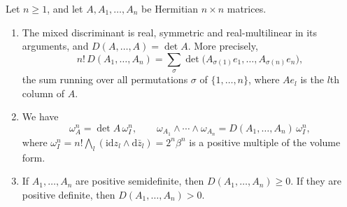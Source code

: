 \begin{lemma}\label{lem:mixed-discriminant-basic}
Let $n\geq1$, and let $A,A_1,\ldots,A_n$ be Hermitian $n\times n$ matrices.
\begin{enumerate}
\item The mixed discriminant is real, symmetric and real-multilinear in its arguments, and $D(A,\ldots,A)=\det A$. More precisely,
\[
 n!\,D(A_1,\ldots,A_n)=\sum_\sigma\det\big(A_{\sigma(1)}e_1,\ldots,A_{\sigma(n)}e_n\big),
\]
the sum running over all permutations $\sigma$ of $\{1,\ldots,n\}$, where $Ae_l$ is the $l$th column of $A$.
\item We have
\[
 \omega_A^n=\det A\,\omega_I^n,\qquad
 \omega_{A_1}\wedge\cdots\wedge\omega_{A_n}=D(A_1,\ldots,A_n)\,\omega_I^n,
\]
where $\omega_I^n=n!\bigwedge_l(\mathrm i\mathrm dz_l\wedge\mathrm d\bar z_l)=2^n\beta^n$ is a positive multiple of the volume form.
\item If $A_1,\ldots,A_n$ are positive semidefinite, then $D(A_1,\ldots,A_n)\geq0$. If they are positive definite, then $D(A_1,\ldots,A_n)>0$.
\end{enumerate}
\end{lemma}
